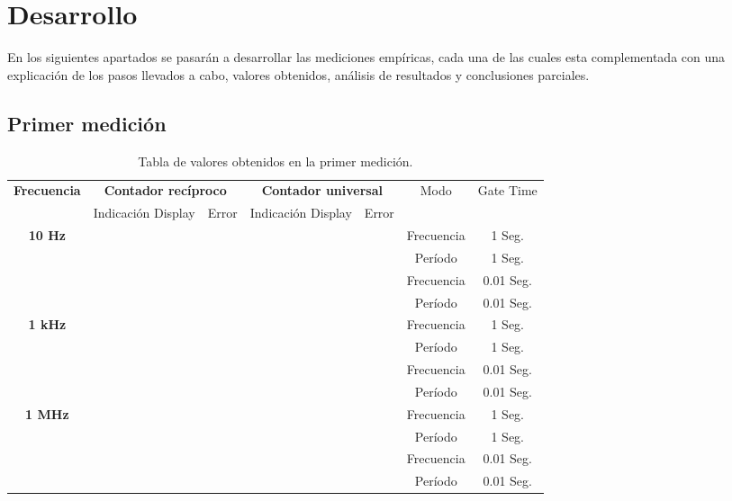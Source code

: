 \documentclass{article}
\begin{document}
\section{Desarrollo}

	En los siguientes apartados se pasarán a desarrollar las mediciones empíricas, cada una de las cuales esta complementada con una explicación de los pasos llevados a cabo, valores obtenidos, análisis de resultados y conclusiones parciales.
\bigskip



\subsection{Primer medición}
	

\newpage
\begin{table}[!hbt]
	\begin{center}

		\begin{tabular}{|c|c|c|c|c|c|c|} \hline
			\multirow{2}{*}{\textbf{Frecuencia}}
			& \multicolumn{2}{c|}{\textbf{Contador recíproco}} & \multicolumn{2}{c|}{\textbf{Contador universal}} & \multirow{2}{*}{Modo} & \multirow{2}{*}{Gate Time} \\\cline{2-5}
			& Indicación Display & Error & Indicación Display & Error \\\hline
			
			\multirow{4}{*}{\textbf{10 Hz}}
			&  &  &  &  & Frecuencia & 1 Seg. \\\cline{2-7}
			&  &  &  &  & Período & 1 Seg. \\\cline{2-7}
			&  &  &  &  & Frecuencia & 0.01 Seg. \\\cline{2-7}
			&  &  &  &  & Período & 0.01 Seg. \\\hline

			\multirow{4}{*}{\textbf{1 kHz}}
			&  &  &  &  & Frecuencia & 1 Seg. \\\cline{2-7}
			&  &  &  &  & Período & 1 Seg. \\\cline{2-7}
			&  &  &  &  & Frecuencia & 0.01 Seg. \\\cline{2-7}
			&  &  &  &  & Período & 0.01 Seg. \\\hline

			\multirow{4}{*}{\textbf{1 MHz}}
			&  &  &  &  & Frecuencia & 1 Seg. \\\cline{2-7}
			&  &  &  &  & Período & 1 Seg. \\\cline{2-7}
			&  &  &  &  & Frecuencia & 0.01 Seg. \\\cline{2-7}
			&  &  &  &  & Período & 0.01 Seg. \\\hline
		\end{tabular}

	\caption{Tabla de valores obtenidos en la primer medición.}
	\end{center}
\end{table}
\medskip
\end{document}
